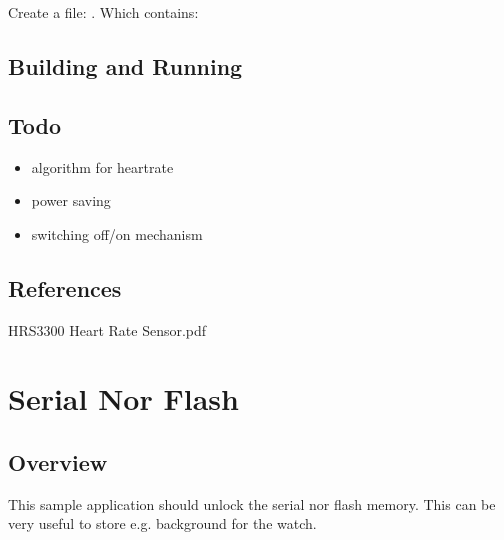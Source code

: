 \documentclass[letterpaper,10pt,english]{sphinxmanual}
\begin{document}
Create a file: .
Which contains:

\begin{sphinxVerbatim}[commandchars=\\\{\}]
 
\end{sphinxVerbatim}


\subsection{Building and Running}
\label{\detokenize{drivers/hrs3300:building-and-running}}

\subsection{Todo}
\label{\detokenize{drivers/hrs3300:todo}}\begin{itemize}
\item {} 
algorithm for heartrate

\item {} 
power saving

\item {} 
switching off/on mechanism

\end{itemize}


\subsection{References}
\label{\detokenize{drivers/hrs3300:references}}
HRS3300 Heart Rate Sensor.pdf


\section{Serial Nor Flash}
\label{\detokenize{drivers/spinor:serial-nor-flash}}\label{\detokenize{drivers/spinor::doc}}
\begin{sphinxVerbatim}[commandchars=\\\{\}]
\end{sphinxVerbatim}


\subsection{Overview}
\label{\detokenize{drivers/spinor:overview}}
This sample application should unlock the serial nor flash memory.
This can be very useful to store e.g. background for the watch.
\end{document}
